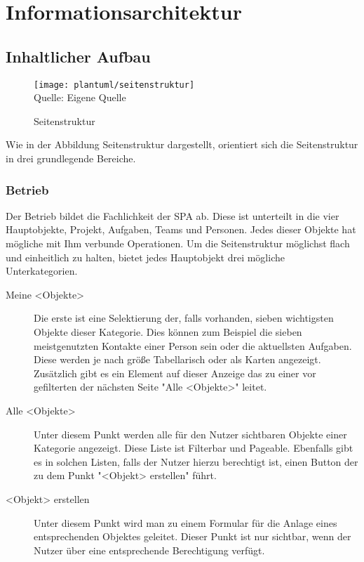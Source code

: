 \newpage


\section{Informationsarchitektur} \label{layout}

\subsection{Inhaltlicher Aufbau}

\begin{figure}[H]
    \caption{Seitenstruktur}
    \texttt{[image: plantuml/seitenstruktur]}
    \\
    Quelle: Eigene Quelle
\end{figure}

Wie in der Abbildung Seitenstruktur dargestellt, orientiert sich die Seitenstruktur in drei grundlegende Bereiche.

\subsubsection{Betrieb}

Der Betrieb bildet die Fachlichkeit der \ac{SPA} ab.
Diese ist unterteilt in die vier Hauptobjekte, Projekt, Aufgaben, Teams und Personen.
Jedes dieser Objekte hat mögliche mit Ihm verbunde Operationen.
Um die Seitenstruktur möglichst flach und einheitlich zu halten, bietet jedes Hauptobjekt drei mögliche Unterkategorien.

\begin{description}
    \item[Meine <Objekte>] Die erste ist eine Selektierung der, falls vorhanden, sieben wichtigsten Objekte dieser Kategorie.
    Dies können zum Beispiel die sieben meistgenutzten Kontakte einer Person sein oder die aktuellsten Aufgaben.
    Diese werden je nach größe Tabellarisch oder als Karten angezeigt.
    Zusätzlich gibt es ein Element auf dieser Anzeige das zu einer vor gefilterten der nächsten Seite "Alle <Objekte>" leitet.
    \item[Alle <Objekte>] Unter diesem Punkt werden alle für den Nutzer sichtbaren Objekte einer Kategorie angezeigt.
    Diese Liste ist Filterbar und Pageable.
    Ebenfalls gibt es in solchen Listen, falls der Nutzer hierzu berechtigt ist, einen Button der zu dem Punkt "<Objekt> erstellen" führt.
    \item[<Objekt> erstellen] Unter diesem Punkt wird man zu einem Formular für die Anlage eines entsprechenden Objektes geleitet.
    Dieser Punkt ist nur sichtbar, wenn der Nutzer über eine entsprechende Berechtigung verfügt.
\end{description}

